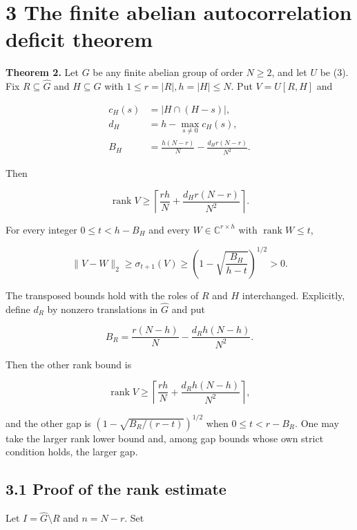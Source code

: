 \documentclass[
  11pt,
  letterpaper,
]{article}
\begin{document}
\section{3 The finite abelian autocorrelation deficit
theorem}\label{the-finite-abelian-autocorrelation-deficit-theorem}

\textbf{Theorem 2.} Let \(G\) be any finite abelian group of order
\(N\geq2\), and let \(U\) be (3). Fix \(R\subseteq\widehat G\) and
\(H\subseteq G\) with \(1\leq r=|R|,h=|H|\leq N\). Put \(V=U[R,H]\) and

\[
\begin{aligned}
c_H(s)&=|H\cap(H-s)|,\\
d_H&=h-\max_{s\neq0}c_H(s),\\
B_H&=\frac{h(N-r)}N-\frac{d_Hr(N-r)}{N^2}.
\end{aligned}                                                \tag{17}
\]

Then

\[
\operatorname{rank}V\geq
\left\lceil\frac{rh}N+\frac{d_Hr(N-r)}{N^2}\right\rceil.
                                                               \tag{18}
\]

For every integer \(0\leq t<h-B_H\) and every
\(W\in\mathbb C^{r\times h}\) with \(\operatorname{rank}W\leq t\),

\[
\|V-W\|_2\geq\sigma_{t+1}(V)
\geq\left(1-\sqrt{\frac{B_H}{h-t}}\right)^{1/2}>0.             \tag{19}
\]

The transposed bounds hold with the roles of \(R\) and \(H\)
interchanged. Explicitly, define \(d_R\) by nonzero translations in
\(\widehat G\) and put

\[
B_R=\frac{r(N-h)}N-\frac{d_Rh(N-h)}{N^2}.
\]

Then the other rank bound is

\[
\operatorname{rank}V\geq
\left\lceil\frac{rh}N+\frac{d_Rh(N-h)}{N^2}\right\rceil,       \tag{20}
\]

and the other gap is \((1-\sqrt{B_R/(r-t)})^{1/2}\) when
\(0\leq t<r-B_R\). One may take the larger rank lower bound and, among
gap bounds whose own strict condition holds, the larger gap.

\subsection{3.1 Proof of the rank
estimate}\label{proof-of-the-rank-estimate}

Let \(I=\widehat G\setminus R\) and \(n=N-r\). Set
\end{document}
